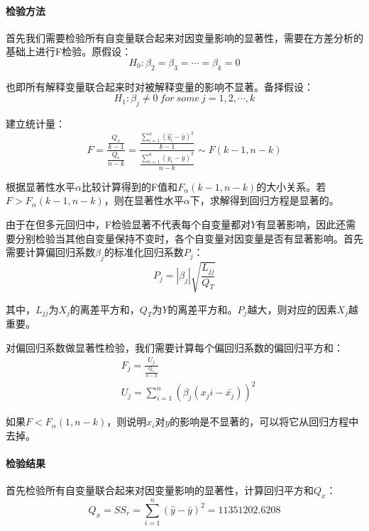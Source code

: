 \documentclass[UTF8]{ctexart}
\begin{document}
	\paragraph{检验方法} 首先我们需要检验所有自变量联合起来对因变量影响的显著性，需要在方差分析的基础上进行F检验。原假设：
	\begin{equation*}
	H_0: \beta_2 = \beta_3 = \cdots = \beta_k = 0
	\end{equation*}
	
	也即所有解释变量联合起来时对被解释变量的影响不显著。备择假设：
	\begin{equation*}
	H_1: \beta_j \neq 0 \ for \ some \   j=1,2,\cdots,k
	\end{equation*}
	
	建立统计量：
	\begin{equation*}
	F = \frac{\frac{Q_x}{k - 1}}{\frac{Q_e}{n - k}} = \frac{\frac{\sum\limits_{i=1}^{n}(\hat{y_i} - \bar{y})^2}{k-1}}{\frac{\sum\limits_{i=1}^{n}(y_i - \bar{y})^2}{n-k}} \sim F(k-1, n-k)
	\end{equation*}
	
	根据显著性水平$\alpha$比较计算得到的F值和$F_{\alpha}(k-1, n-k)$的大小关系。若$F > F_{\alpha}(k-1, n-k)$，则在显著性水平$\alpha$下，求解得到回归方程是显著的。
	
	由于在但多元回归中，F检验显著不代表每个自变量都对$Y$有显著影响，因此还需要分别检验当其他自变量保持不变时，各个自变量对因变量是否有显著影响。首先需要计算偏回归系数$\beta_j$的标准化回归系数$P_j$：
	\begin{equation*}
	P_j= |\beta_j|\sqrt{\frac{L_{jj}}{Q_T}}
	\end{equation*}
	
	其中，$L_{jj}$为$X_j$的离差平方和，$Q_T$为$Y$的离差平方和。$P_j$越大，则对应的因素$X_j$越重要。
	
	对偏回归系数做显著性检验，我们需要计算每个偏回归系数的偏回归平方和：
	\begin{align*}
	& F_j = \frac{U_j}{\frac{Q_e}{n - k}}\\
	& U_j = \sum\limits_{i=1}^{n}(\beta_j(x_ji - \bar{x_j}))^2
	\end{align*}
	
	如果$F < F_{\alpha}(1, n - k)$，则说明$x_i$对$y$的影响是不显著的，可以将它从回归方程中去掉。
	
	\paragraph{检验结果} 首先检验所有自变量联合起来对因变量影响的显著性，计算回归平方和$Q_x$：
	\begin{equation*}
	Q_x = SS_r = \sum\limits_{i=1}^{n}(\hat{y} - \bar{y})^2 = 11351202.6208
	\end{equation*}
	
\end{document}
